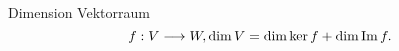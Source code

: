 \documentclass[class=article, crop=false]{standalone}
\begin{document}
\begin{zettel}{Dimension Vektorraum}
\[
    f:V \longrightarrow W, \dim V =  \dim \ker f +  \dim  \operatorname{Im} f
.\]

\end{zettel}
\end{document}
